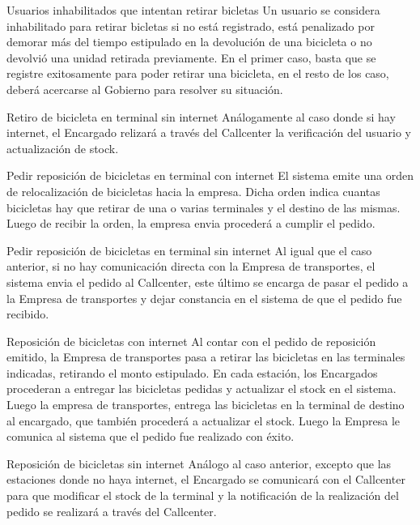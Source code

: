 \begin{subsection}{Usuarios inhabilitados que intentan retirar bicletas}
Un usuario se considera inhabilitado para retirar bicletas si no está registrado, está penalizado por demorar más del tiempo estipulado en la devolución de una bicicleta o no devolvió una unidad retirada previamente. En el primer caso, basta que se registre exitosamente para poder retirar una bicicleta, en el resto de los caso, deberá acercarse al Gobierno para resolver su situación.
\end{subsection}

\begin{subsection}{Retiro de bicicleta en terminal sin internet}
Análogamente al caso donde si hay internet, el Encargado relizará a través del Callcenter la verificación del usuario y actualización de stock.
\end{subsection}

\begin{subsection}{Pedir reposición de bicicletas en terminal con internet}
El sistema emite una orden de relocalización de bicicletas hacia la empresa. Dicha orden indica cuantas bicicletas hay que retirar de una o varias terminales y el destino de las mismas. Luego de recibir la orden, la empresa envia procederá a cumplir el pedido.
\end{subsection}

\begin{subsection}{Pedir reposición de bicicletas en terminal sin internet}
Al igual que el caso anterior, si no hay comunicación directa con la Empresa de transportes, el sistema envia el pedido al Callcenter, este último se encarga de pasar el pedido a la Empresa de transportes y dejar constancia en el sistema de que el pedido fue recibido.
\end{subsection}

\begin{subsection}{Reposición de bicicletas con internet}
Al contar con el pedido de reposición emitido, la Empresa de transportes pasa a retirar las bicicletas en las terminales indicadas, retirando el monto estipulado. En cada estación, los Encargados procederan a entregar las bicicletas pedidas y actualizar el stock en el sistema. Luego la empresa de transportes, entrega las bicicletas en la terminal de destino al encargado, que también procederá a actualizar el stock. Luego la Empresa le comunica al sistema que el pedido fue realizado con éxito.
\end{subsection}

\begin{subsection}{Reposición de bicicletas sin internet}
Análogo al caso anterior, excepto que las estaciones donde no haya internet, el Encargado se comunicará con el Callcenter para que modificar el stock de la terminal y la notificación de la realización del pedido se realizará a través del Callcenter.
\end{subsection}

